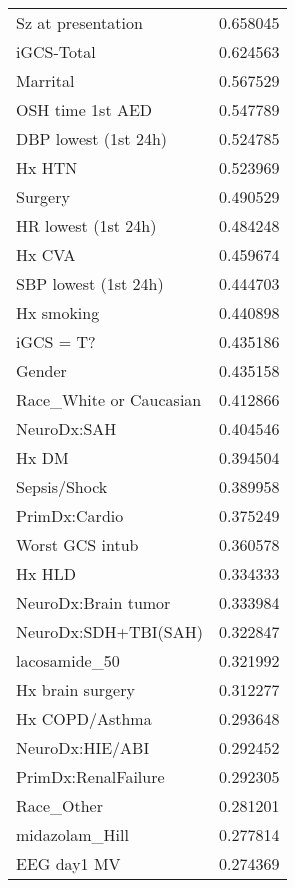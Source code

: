 \begin{tabular}{lr}
Sz at presentation             &   0.658045 \\
iGCS-Total                     &   0.624563 \\
Marrital                       &   0.567529 \\
OSH time 1st AED               &   0.547789 \\
DBP lowest (1st 24h)           &   0.524785 \\
Hx HTN                         &   0.523969 \\
Surgery                        &   0.490529 \\
HR lowest (1st 24h)            &   0.484248 \\
Hx CVA                         &   0.459674 \\
SBP lowest (1st 24h)           &   0.444703 \\
Hx smoking                     &   0.440898 \\
iGCS = T?                      &   0.435186 \\
Gender                         &   0.435158 \\
Race\_White or Caucasian        &   0.412866 \\
NeuroDx:SAH                    &   0.404546 \\
Hx DM                          &   0.394504 \\
Sepsis/Shock                   &   0.389958 \\
PrimDx:Cardio                  &   0.375249 \\
Worst GCS intub                &   0.360578 \\
Hx HLD                         &   0.334333 \\
NeuroDx:Brain tumor            &   0.333984 \\
NeuroDx:SDH+TBI(SAH)           &   0.322847 \\
lacosamide\_50                  &   0.321992 \\
Hx brain surgery               &   0.312277 \\
Hx COPD/Asthma                 &   0.293648 \\
NeuroDx:HIE/ABI                &   0.292452 \\
PrimDx:RenalFailure            &   0.292305 \\
Race\_Other                     &   0.281201 \\
midazolam\_Hill                 &   0.277814 \\
EEG day1 MV                    &   0.274369 \\

\end{tabular}
